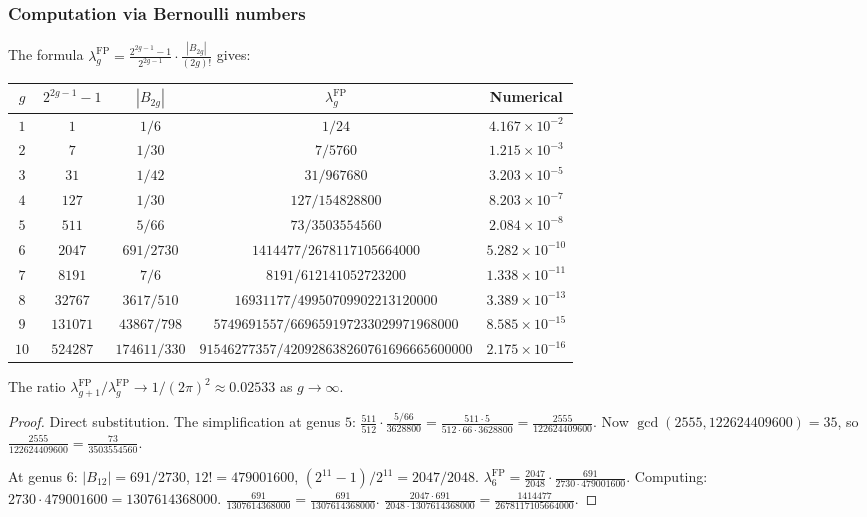 \subsubsection{Computation via Bernoulli numbers}

\begin{computation}
The formula $\lambda_g^{\mathrm{FP}} = \frac{2^{2g-1}-1}{2^{2g-1}} \cdot \frac{|B_{2g}|}{(2g)!}$ gives:
\begin{center}
\renewcommand{\arraystretch}{1.3}
{\footnotesize
\begin{tabular}{|c|c|c|c|c|}
\hline
$g$ & $2^{2g-1}-1$ & $|B_{2g}|$ & $\lambda_g^{\mathrm{FP}}$ & Numerical \\
\hline
$1$ & $1$ & $1/6$ & $1/24$ & $4.167 \times 10^{-2}$ \\
$2$ & $7$ & $1/30$ & $7/5760$ & $1.215 \times 10^{-3}$ \\
$3$ & $31$ & $1/42$ & $31/967680$ & $3.203 \times 10^{-5}$ \\
$4$ & $127$ & $1/30$ & $127/154828800$ & $8.203 \times 10^{-7}$ \\
$5$ & $511$ & $5/66$ & $73/3503554560$ & $2.084 \times 10^{-8}$ \\
$6$ & $2047$ & $691/2730$ & $1414477/2678117105664000$ & $5.282 \times 10^{-10}$ \\
$7$ & $8191$ & $7/6$ & $8191/612141052723200$ & $1.338 \times 10^{-11}$ \\
$8$ & $32767$ & $3617/510$ & $16931177/49950709902213120000$ & $3.389 \times 10^{-13}$ \\
$9$ & $131071$ & $43867/798$ & $5749691557/669659197233029971968000$ & $8.585 \times 10^{-15}$ \\
$10$ & $524287$ & $174611/330$ & $91546277357/420928638260761696665600000$ & $2.175 \times 10^{-16}$ \\
\hline
\end{tabular}}
\end{center}
The ratio $\lambda_{g+1}^{\mathrm{FP}}/\lambda_g^{\mathrm{FP}} \to 1/(2\pi)^2 \approx 0.02533$ as $g \to \infty$.
\end{computation}

\begin{proof}
Direct substitution. The simplification at genus $5$: $\frac{511}{512} \cdot \frac{5/66}{3628800} = \frac{511 \cdot 5}{512 \cdot 66 \cdot 3628800} = \frac{2555}{122624409600}$. Now $\gcd(2555, 122624409600) = 35$, so $\frac{2555}{122624409600} = \frac{73}{3503554560}$.

At genus $6$: $|B_{12}| = 691/2730$, $12! = 479001600$, $(2^{11}-1)/2^{11} = 2047/2048$. $\lambda_6^{\mathrm{FP}} = \frac{2047}{2048} \cdot \frac{691}{2730 \cdot 479001600}$. Computing: $2730 \cdot 479001600 = 1307614368000$. $\frac{691}{1307614368000} = \frac{691}{1307614368000}$. $\frac{2047 \cdot 691}{2048 \cdot 1307614368000} = \frac{1414477}{2678117105664000}$.
\end{proof}

